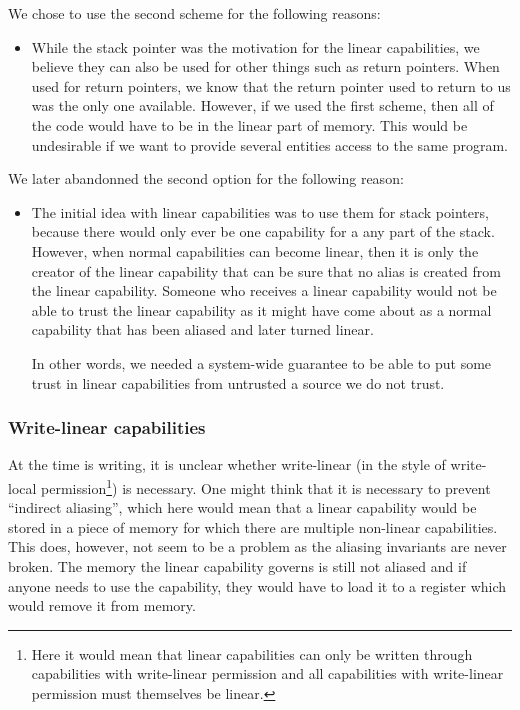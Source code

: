 \documentclass[a4paper]{article}
\begin{document}
We chose to use the second scheme for the following reasons:
\begin{itemize}
\item While the stack pointer was the motivation for the linear capabilities, we believe they can also be used for other things such as return pointers. When used for return pointers, we know that the return pointer used to return to us was the only one available. However, if we used the first scheme, then all of the code would have to be in the linear part of memory. This would be undesirable if we want to provide several entities access to the same program. 
\end{itemize}
We later abandonned the second option for the following reason:
\begin{itemize}
\item The initial idea with linear capabilities was to use them for stack pointers, because there would only ever be one capability for a any part of the stack. However, when normal capabilities can become linear, then it is only the creator of the linear capability that can be sure that no alias is created from the linear capability. Someone who receives a linear capability would not be able to trust the linear capability as it might have come about as a normal capability that has been aliased and later turned linear.

In other words, we needed a system-wide guarantee to be able to put some trust in linear capabilities from untrusted a source we do not trust.
\end{itemize}

\subsubsection{Write-linear capabilities}

At the time is writing, it is unclear whether write-linear (in the style of write-local permission\footnote{Here it would mean that linear capabilities can only be written through capabilities with write-linear permission and all capabilities with write-linear permission must themselves be linear.}) is necessary. One might think that it is necessary to prevent ``indirect aliasing'', which here would mean that a linear capability would be stored in a piece of memory for which there are multiple non-linear capabilities. This does, however, not seem to be a problem as the aliasing invariants are never broken. The memory the linear capability governs is still not aliased and if anyone needs to use the capability, they would have to load it to a register which would remove it from memory.
\end{document}
